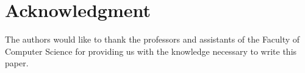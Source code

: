 \documentclass[12pt,journal,compsoc]{IEEEtran}
\begin{document}
  \section*{Acknowledgment}
\fi


The authors would like to thank the professors and assistants of the Faculty of Computer Science for providing us with the knowledge necessary to write this paper.


\ifCLASSOPTIONcaptionsoff
  \newpage
\fi





%
%
%






% 
\end{document}
